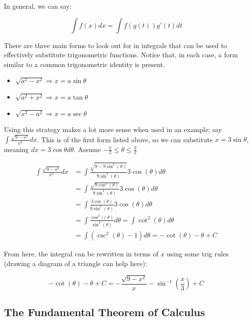 \documentclass[12pt]{article}
\begin{document}
In general, we can say:

$$
\int f(x) dx = \int f(g(t)) g'(t) dt
$$

There are three main forms to look out for in integrals that can be used to effectively substitute trigonometric functions. Notice that, in each case, a form similar to a common trigonometric identity is present.

\begin{itemize}
    \item $\sqrt{a^2-x^2}  \Rightarrow x = a \sin \theta $ 
    
    \item $\sqrt{a^2+x^2} \Rightarrow x = a \tan \theta$
    
    \item $\sqrt{x^2-a^2} \Rightarrow x = a \sec \theta$
\end{itemize}

Using this strategy makes a lot more sense when used in an example; say $\int \frac{\sqrt{9-x^2}}{x^2} dx$. This is of the first form listed above, so we can substitute $x=3\sin \theta$, meaning $dx = 3\cos\theta d\theta$. Assume $-\frac{\pi}{2} \leq \theta \leq \frac{\pi}{2}$

\begin{equation}
    \begin{split}
        \int \frac{\sqrt{9-x^2}}{x^2}dx &= \int \frac{\sqrt{9-9\sin^2(\theta)}}{9\sin^2(\theta)}3\cos(\theta)d\theta\\
        &= \int \frac{\sqrt{9\cos^2(\theta)}}{9\sin^2(\theta)}3\cos(\theta)d\theta\\
        &= \int \frac{3\cos(\theta)}{9\sin^2(\theta)}3\cos(\theta)d\theta\\
        &= \int \frac{\cos^2)(\theta)}{\sin^2(\theta)}d\theta = \int \cot^2(\theta) d\theta\\
        &= \int (\csc^2(\theta)-1)d\theta = -\cot(\theta) -\theta + C
    \end{split}
\end{equation}

From here, the integral can be rewritten in terms of $x$ using some trig rules (drawing a diagram of a triangle can help here):

$$-\cot(\theta)-\theta + C = -\frac{\sqrt{9-x^2}}{x}-\sin^{-1}(\frac{x}{3})+C$$
\subsection{The Fundamental Theorem of Calculus}
\end{document}
